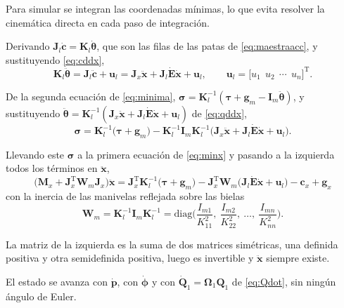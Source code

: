 \documentclass[11pt]{article}
\newcommand{\T}{^{\mathrm{T}}}
\newcommand{\pvec}{\mathbf{p}}
\newcommand{\sig}{\boldsymbol{\sigma}}
\newcommand{\cd}{\dot{\mathbf{c}}}
\newcommand{\cdd}{\ddot{\mathbf{c}}}
\newcommand{\xd}{\dot{\mathbf{x}}}
\newcommand{\xdd}{\ddot{\mathbf{x}}}
\newcommand{\Om}{\boldsymbol{\Omega}}
\newcommand{\thv}{\boldsymbol{\theta}}
\newcommand{\tauv}{\boldsymbol{\tau}}
\begin{document}
Para simular se integran las coordenadas mínimas, lo que evita resolver la cinemática directa en cada paso de integración.

Derivando $\mathbf{J}_l\cd=\mathbf{K}_l\dot{\thv}$, que son las filas de las patas de \eqref{eq:maestraacc}, y sustituyendo \eqref{eq:cddx},
\begin{equation}
\mathbf{K}_l\ddot{\thv}=\mathbf{J}_l\cdd+\mathbf{u}_l=\mathbf{J}_x\xdd+\mathbf{J}_l\dot{\mathbf{E}}\xd+\mathbf{u}_l,
\qquad
\mathbf{u}_l=\big[u_1\ \ u_2\ \ \cdots\ \ u_n\big]\T .
\label{eq:qddx}
\end{equation}

De la segunda ecuación de \eqref{eq:minima}, $\sig=\mathbf{K}_l^{-1}(\tauv+\mathbf{g}_m-\mathbf{I}_m\ddot{\thv})$, y sustituyendo $\ddot{\thv}=\mathbf{K}_l^{-1}(\mathbf{J}_x\xdd+\mathbf{J}_l\dot{\mathbf{E}}\xd+\mathbf{u}_l)$ de \eqref{eq:qddx},
\begin{equation}
\sig=\mathbf{K}_l^{-1}\big(\tauv+\mathbf{g}_m\big)-\mathbf{K}_l^{-1}\mathbf{I}_m\mathbf{K}_l^{-1}\big(\mathbf{J}_x\xdd+\mathbf{J}_l\dot{\mathbf{E}}\xd+\mathbf{u}_l\big).
\label{eq:sigdd}
\end{equation}

Llevando este $\sig$ a la primera ecuación de \eqref{eq:minx} y pasando a la izquierda todos los términos en $\xdd$,
\begin{equation}
\boxed{\ \Big(\mathbf{M}_x+\mathbf{J}_x\T\mathbf{W}_m\mathbf{J}_x\Big)\xdd
=\mathbf{J}_x\T\mathbf{K}_l^{-1}\big(\tauv+\mathbf{g}_m\big)
-\mathbf{J}_x\T\mathbf{W}_m\big(\mathbf{J}_l\dot{\mathbf{E}}\xd+\mathbf{u}_l\big)
-\mathbf{c}_x+\mathbf{g}_x\ }
\label{eq:directa}
\end{equation}
con la inercia de las manivelas reflejada sobre las bielas
\begin{equation}
\mathbf{W}_m=\mathbf{K}_l^{-1}\mathbf{I}_m\mathbf{K}_l^{-1}
=\mathrm{diag}\Big(\frac{I_{m1}}{K_{11}^2},\ \frac{I_{m2}}{K_{22}^2},\ \dots,\ \frac{I_{mn}}{K_{nn}^2}\Big).
\label{eq:Ws}
\end{equation}

La matriz de la izquierda es la suma de dos matrices simétricas, una definida positiva y otra semidefinida positiva, luego es invertible y $\xdd$ siempre existe.

El estado se avanza con $\dot{\pvec}$, con $\dot{\boldsymbol{\phi}}$ y con $\dot{\mathbf{Q}}_1=\Om_1\mathbf{Q}_1$ de \eqref{eq:Qdot}, sin ningún ángulo de Euler.
\end{document}
